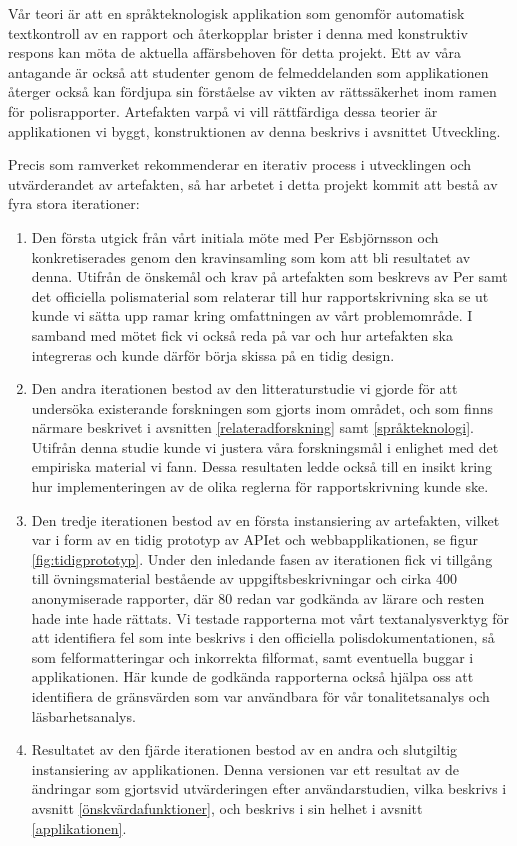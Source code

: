 \documentclass[swedish]{maucsthesis}
\begin{document}
Vår teori är att en språkteknologisk applikation som genomför automatisk
textkontroll av en rapport och återkopplar brister i denna med konstruktiv
respons kan möta de aktuella affärsbehoven för detta projekt. Ett av våra
antagande är också att studenter genom de felmeddelanden som applikationen
återger också kan fördjupa sin förståelse av vikten av rättssäkerhet inom ramen
för polisrapporter. Artefakten varpå vi vill rättfärdiga dessa teorier är
applikationen vi byggt, konstruktionen av denna beskrivs i avsnittet Utveckling.

Precis som ramverket rekommenderar en iterativ process i utvecklingen och
utvärderandet av artefakten, så har arbetet i detta projekt kommit att bestå av
fyra stora iterationer:

\begin{enumerate}
\item Den första utgick från vårt initiala möte med Per Esbjörnsson och
  konkretiserades genom den kravinsamling som kom att bli resultatet av denna.
  Utifrån de önskemål och krav på artefakten som beskrevs av Per samt det
  officiella polismaterial som relaterar till hur rapportskrivning ska se ut
  kunde vi sätta upp ramar kring omfattningen av vårt problemområde. I samband
  med mötet fick vi också reda på var och hur artefakten ska integreras och
  kunde därför börja skissa på en tidig design.
\item Den andra iterationen bestod av den litteraturstudie vi gjorde för att
  undersöka existerande forskningen som gjorts inom området, och som finns
  närmare beskrivet i avsnitten \ref{relateradforskning} samt \ref{språkteknologi}.
  Utifrån denna studie kunde vi justera våra forskningsmål i enlighet med det
  empiriska material vi fann. Dessa resultaten ledde också till en insikt kring
  hur implementeringen av de olika reglerna för rapportskrivning kunde ske.
\item Den tredje iterationen bestod av en första instansiering av artefakten,
  vilket var i form av en tidig prototyp av APIet och webbapplikationen, se
  figur \ref{fig:tidigprototyp}. Under den inledande fasen av iterationen fick
  vi tillgång till övningsmaterial bestående av uppgiftsbeskrivningar och cirka
  400 anonymiserade rapporter, där 80 redan var godkända av lärare och resten
  hade inte hade rättats. Vi testade rapporterna mot vårt textanalysverktyg för
  att identifiera fel som inte beskrivs i den officiella polisdokumentationen,
  så som felformatteringar och inkorrekta filformat, samt eventuella buggar i
  applikationen. Här kunde de godkända rapporterna också hjälpa oss att
  identifiera de gränsvärden som var användbara för vår tonalitetsanalys och
  läsbarhetsanalys.
\item Resultatet av den fjärde iterationen bestod av en andra och slutgiltig
  instansiering av applikationen. Denna versionen var ett resultat av de
  ändringar som gjortsvid utvärderingen efter användarstudien, vilka beskrivs i
  avsnitt \ref{önskvärdafunktioner}, och beskrivs i sin helhet i
  avsnitt \ref{applikationen}.
\end{enumerate}
\end{document}
